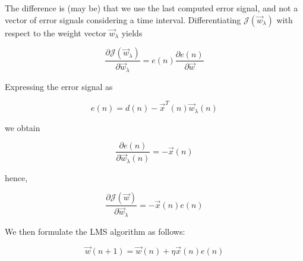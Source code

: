 \documentclass[twocolumn]{article}
\begin{document}
The difference is (may be) that we use the last computed error signal, and not a vector of error signals considering a time interval. Differentiating $ \mathcal{J} ( \vec{w}_{\lambda}) $ with respect to the weight vector $ \vec{w}_{\lambda} $ yields

$$ \dfrac{\partial \mathcal{J} ( \vec{w}_{\lambda})}{\partial \vec{w}_{\lambda}} = e (n) \dfrac{\partial e (n)}{\partial \vec{w}} $$

Expressing the error signal as 

$$ e (n) = d (n) - \vec{x}^{T} (n) \vec{w}_{\lambda} (n) $$

\noindent we obtain

$$ \dfrac{\partial e (n)}{\partial \vec{w}_{\lambda} (n)} = - \vec{x} (n) $$

\noindent hence,

$$ \dfrac{\partial \mathcal{J} (\vec{w})}{\partial \vec{w}_{\lambda}} = - \vec{x} (n) e (n)  $$

We then formulate the LMS algorithm as follows:

$$ \vec{w}(n+1) = \vec{w} (n) + \eta \vec{x} (n) e (n) $$
\end{document}
